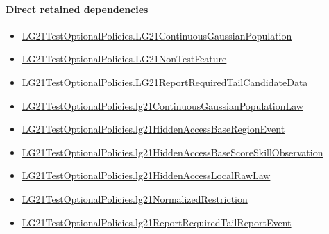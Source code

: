 \documentclass[10pt]{article}
\begin{document}
\paragraph{Direct retained dependencies}
\begin{itemize}\raggedright
\item \hyperlink{paper-prerequisite-f5e1c886d250142b}{LG21\allowbreak{}Test\allowbreak{}Optional\allowbreak{}Policies.\allowbreak{}LG21\allowbreak{}Continuous\allowbreak{}Gaussian\allowbreak{}Population}
\item \hyperlink{governing-declaration-81cb73bf3869c56d}{LG21\allowbreak{}Test\allowbreak{}Optional\allowbreak{}Policies.\allowbreak{}LG21\allowbreak{}Non\allowbreak{}Test\allowbreak{}Feature}
\item \hyperlink{governing-declaration-86a64a1aa812778e}{LG21\allowbreak{}Test\allowbreak{}Optional\allowbreak{}Policies.\allowbreak{}LG21\allowbreak{}Report\allowbreak{}Required\allowbreak{}Tail\allowbreak{}Candidate\allowbreak{}Data}
\item \hyperlink{governing-declaration-8fd8cc4e09eeb58a}{LG21\allowbreak{}Test\allowbreak{}Optional\allowbreak{}Policies.\allowbreak{}lg21\allowbreak{}Continuous\allowbreak{}Gaussian\allowbreak{}Population\allowbreak{}Law}
\item \hyperlink{governing-declaration-cecb402908ae7bf6}{LG21\allowbreak{}Test\allowbreak{}Optional\allowbreak{}Policies.\allowbreak{}lg21\allowbreak{}Hidden\allowbreak{}Access\allowbreak{}Base\allowbreak{}Region\allowbreak{}Event}
\item \hyperlink{governing-declaration-52712eb1079dfba5}{LG21\allowbreak{}Test\allowbreak{}Optional\allowbreak{}Policies.\allowbreak{}lg21\allowbreak{}Hidden\allowbreak{}Access\allowbreak{}Base\allowbreak{}Score\allowbreak{}Skill\allowbreak{}Observation}
\item \hyperlink{governing-declaration-021e105247bd247f}{LG21\allowbreak{}Test\allowbreak{}Optional\allowbreak{}Policies.\allowbreak{}lg21\allowbreak{}Hidden\allowbreak{}Access\allowbreak{}Local\allowbreak{}Raw\allowbreak{}Law}
\item \hyperlink{governing-declaration-ee825e256b6d452b}{LG21\allowbreak{}Test\allowbreak{}Optional\allowbreak{}Policies.\allowbreak{}lg21\allowbreak{}Normalized\allowbreak{}Restriction}
\item \hyperlink{governing-declaration-7168d35e0f623750}{LG21\allowbreak{}Test\allowbreak{}Optional\allowbreak{}Policies.\allowbreak{}lg21\allowbreak{}Report\allowbreak{}Required\allowbreak{}Tail\allowbreak{}Report\allowbreak{}Event}
\end{itemize}
\hypertarget{governing-declaration-864713775c75c21b}{}
\end{document}
